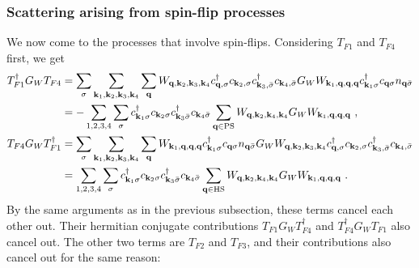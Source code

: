 \documentclass[reprint,hidelinks,onecolumn]{revtex4-2}
\begin{document}
\subsubsection*{Scattering arising from spin-flip processes}
We now come to the processes that involve spin-flips. Considering \(T_{F1}\) and \(T_{F4}\) first, we get
\begin{equation}\begin{aligned}
	T_{F1}^\dagger G_W T_{F4} &= \sum_\sigma\sum_{{\bf k}_1, {\bf k}_2, {\bf k}_3, {\bf k}_4} \sum_{\bf q} W_{{\bf q},{\bf k}_2,{\bf k}_3,{\bf k}_4}c^\dagger_{{\bf q},\sigma}c_{{\bf k}_2,\sigma}c^\dagger_{{\bf k}_3,\bar\sigma}c_{{\bf k}_4,\bar\sigma} G_W W_{{\bf k}_1, {\bf q}, {\bf q}, {\bf q}}  c^\dagger_{{\bf k}_1\sigma} c_{{\bf q}\sigma} n_{{\bf q} \bar \sigma} \\
							  &= -\sum_{1,2,3,4}\sum_\sigma c^\dagger_{{\bf k}_1\sigma} c_{{\bf k}_2\sigma} c^\dagger_{{\bf k}_3\bar\sigma} c_{{\bf k}_4\bar \sigma} \sum_{\bf q \in \text{PS}} W_{{\bf q}, {\bf k}_2, {\bf k}_4, {\bf k}_4} G_W W_{{\bf k}_1, {\bf q}, {\bf q}, {\bf q}}~,\\
	T_{F4} G_W T_{F1}^\dagger &= \sum_\sigma\sum_{{\bf k}_1, {\bf k}_2, {\bf k}_3, {\bf k}_4} \sum_{\bf q}W_{{\bf k}_1, {\bf q}, {\bf q}, {\bf q}}  c^\dagger_{{\bf k}_1\sigma} c_{{\bf q}\sigma} n_{{\bf q} \bar \sigma} G_W W_{{\bf q},{\bf k}_2,{\bf k}_3,{\bf k}_4}c^\dagger_{{\bf q},\sigma}c_{{\bf k}_2,\sigma}c^\dagger_{{\bf k}_3,\bar\sigma}c_{{\bf k}_4,\bar\sigma}  \\
							  &= \sum_{1,2,3,4}\sum_\sigma c^\dagger_{{\bf k}_1\sigma} c_{{\bf k}_2\sigma} c^\dagger_{{\bf k}_3\bar\sigma} c_{{\bf k}_4\bar \sigma} \sum_{\bf q \in \text{HS}} W_{{\bf q}, {\bf k}_2, {\bf k}_4, {\bf k}_4} G_W W_{{\bf k}_1, {\bf q}, {\bf q}, {\bf q}}~.
\end{aligned}\end{equation}
By the same arguments as in the previous subsection, these terms cancel each other out. Their hermitian conjugate contributions \(T_{F1} G_W T_{F4}^\dagger\) and \(T_{F4}^\dagger G_W T_{F1}\) also cancel out. The other two terms are \(T_{F2}\) and \(T_{F3}\), and their contributions also cancel out for the same reason:
\end{document}
